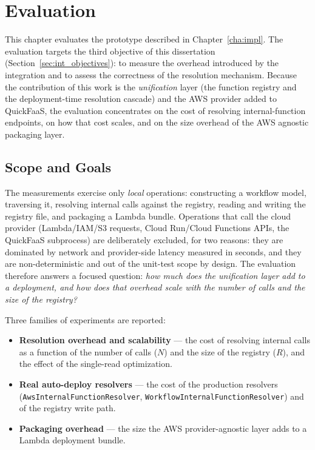 \chapter{Evaluation}
\label{cha:evaluation}

This chapter evaluates the prototype described in Chapter~\ref{cha:impl}. The evaluation targets
the third objective of this dissertation (Section~\ref{sec:int_objectives}): to measure the
overhead introduced by the integration and to assess the correctness of the resolution mechanism.
Because the contribution of this work is the \emph{unification} layer (the function registry and
the deployment-time resolution cascade) and the AWS provider added to QuickFaaS, the evaluation
concentrates on the cost of resolving internal-function endpoints, on how that cost scales, and on
the size overhead of the AWS agnostic packaging layer.

\section{Scope and Goals}
\label{sec:eval-scope}

The measurements exercise only \emph{local} operations: constructing a workflow model, traversing
it, resolving internal calls against the registry, reading and writing the registry file, and
packaging a Lambda bundle. Operations that call the cloud provider (Lambda/IAM/S3 requests, Cloud
Run/Cloud Functions APIs, the QuickFaaS subprocess) are deliberately excluded, for two reasons:
they are dominated by network and provider-side latency measured in seconds, and they are
non-deterministic and out of the unit-test scope by design. The evaluation therefore answers a
focused question: \emph{how much does the unification layer add to a deployment, and how does that
overhead scale with the number of calls and the size of the registry?}

Three families of experiments are reported:
\begin{itemize}
  \item \textbf{Resolution overhead and scalability} --- the cost of resolving internal calls as a
  function of the number of calls ($N$) and the size of the registry ($R$), and the effect of the
  single-read optimization.
  \item \textbf{Real auto-deploy resolvers} --- the cost of the production resolvers
  (\texttt{Aws\allowbreak Internal\allowbreak Function\allowbreak Resolver}, \texttt{Workflow\allowbreak Internal\allowbreak Function\allowbreak Resolver}) and of the
  registry write path.
  \item \textbf{Packaging overhead} --- the size the AWS provider-agnostic layer adds to a Lambda
  deployment bundle.
\end{itemize}

